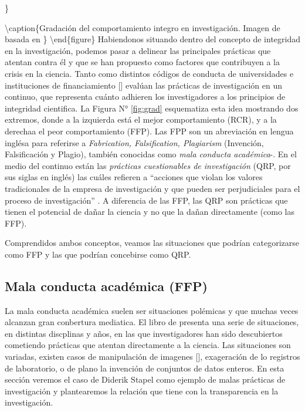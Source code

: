 \documentclass[
]{book}
\begin{document}
\}

\textbackslash caption\{Gradación del comportamiento integro en investigación. Imagen de \citet{abrilruiz_Manzanas_2019} basada en \citet{steneck_Fostering_2006}\}\label{fig:grad}
\textbackslash end\{figure\}
Habiendonos situando dentro del concepto de integridad en la investigación, podemos pasar a delinear las principales prácticas que atentan contra él y que se han propuesto como factores que contribuyen a la crisis en la ciencia. Tanto \citet{steneck_Fostering_2006} como distintos códigos de conducta de universidades e instituciones de financiamiento {[}{]} evalúan las prácticas de investigación en un continuo, que representa cuánto adhieren los investigadores a los principios de integridad cientifica. La Figura N° \ref{fig:grad} esquematiza esta idea mostrando dos extremos, donde a la izquierda está el mejor comportamiento (RCR), y a la derechaa el peor comportamiento (FFP). Las FPP son un abreviación en lengua inglésa para referirse a \emph{Fabrication, Falsification, Plagiarism} (Invención, Falsificación y Plagio), también conocidas como \emph{mala conducta académica}-. En el medio del continuo están las \emph{prácticas cuestionables de investigación} (QRP, por sus siglas en inglés) las cuáles refieren a ``acciones que violan los valores tradicionales de la empresa de investigación y que pueden ser perjudiciales para el proceso de investigación'' \citep[\emph{National Academies of Science} 1992 en][p.58]{steneck_Fostering_2006}. A diferencia de las FFP, las QRP son prácticas que tienen el potencial de dañar la ciencia y no que la dañan directamente (como las FFP).

Comprendidos ambos conceptos, veamos las situaciones que podrían categorizarse como FFP y las que podrían concebirse como QRP.

\hypertarget{mala-conducta-acaduxe9mica-ffp}{%
\subsection{Mala conducta académica (FFP)}\label{mala-conducta-acaduxe9mica-ffp}}

La mala conducta académica suelen ser situaciones polémicas y que muchas veces alcanzan gran conbertura mediatica. El libro de \citet{abrilruiz_Manzanas_2019} presenta una serie de situaciones, en distintas discplinas y años, en las que investigadores han sido descubiertos cometiendo prácticas que atentan directamente a la ciencia. Las situaciones son variadas, existen casos de manipulación de imagenes {[}{]}, exageración de lo registros de laboratorio, o de plano la invención de conjuntos de datos enteros. En esta sección veremos el caso de Diderik Stapel como ejemplo de malas prácticas de investigación y plantearemos la relación que tiene con la transparencia en la investigación.
\end{document}

